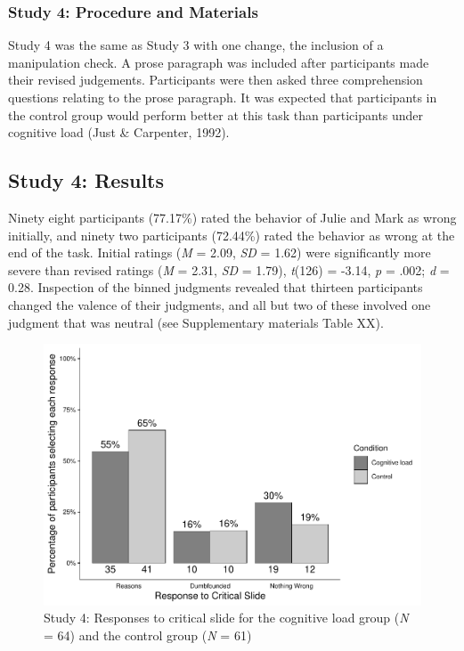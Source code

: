 \documentclass[
  american,
  man,floatsintext]{apa7}
\begin{document}
\hypertarget{study-4-procedure-and-materials}{%
\subsubsection{Study 4: Procedure and Materials}\label{study-4-procedure-and-materials}}

Study 4 was the same as Study 3 with one change, the inclusion of a manipulation check. A prose paragraph was included after participants made their revised judgements. Participants were then asked three comprehension questions relating to the prose paragraph. It was expected that participants in the control group would perform better at this task than participants under cognitive load (Just \& Carpenter, 1992).

\hypertarget{study-4-results}{%
\subsection{Study 4: Results}\label{study-4-results}}

Ninety eight participants (77.17\%) rated the behavior of Julie and Mark as wrong initially, and ninety two participants (72.44\%) rated the behavior as wrong at the end of the task. Initial ratings (\emph{M} = 2.09, \emph{SD} = 1.62) were significantly more severe than revised ratings (\emph{M} = 2.31, \emph{SD} = 1.79), \emph{t}(126) = -3.14, \emph{p} = .002; \emph{d} = 0.28. Inspection of the binned judgments revealed that thirteen participants changed the valence of their judgments, and all but two of these involved one judgment that was neutral (see Supplementary materials Table XX).

\begin{figure}
\centering
\includegraphics{cog_load_in_chunks_files/figure-latex/ch5S4fig2criticalcondition-1.pdf}
\caption{\label{fig:ch5S4fig2criticalcondition}Study 4: Responses to critical slide for the cognitive load group (\emph{N} = 64) and the control group (\emph{N} = 61)}
\end{figure}
\end{document}
